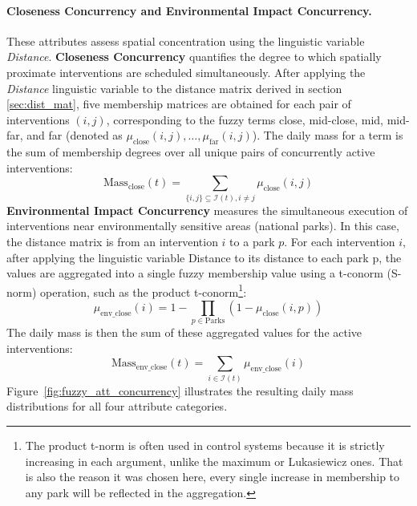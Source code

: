 \paragraph{Closeness Concurrency and Environmental Impact Concurrency.}
These attributes assess spatial concentration using the linguistic variable \textit{Distance}. \textbf{Closeness Concurrency} quantifies the degree to which spatially proximate interventions are scheduled simultaneously. After applying the \textit{Distance} linguistic variable to the distance matrix derived in section \ref{sec:dist_mat}, five membership matrices are obtained for each pair of interventions $(i, j)$, corresponding to the fuzzy terms close, mid-close, mid, mid-far, and far (denoted as $\mu_{\text{close}}(i, j),\dots ,\mu_{\text{far}}(i, j)$). The daily mass for a term is the sum of membership degrees over all unique pairs of concurrently active interventions:
\[
    \text{Mass}_{\text{close}}(t) = \sum_{\{i,j\} \subseteq \mathcal{I}(t), i \neq j} \mu_{\text{close}}(i, j)
\]
\textbf{Environmental Impact Concurrency} measures the simultaneous execution of interventions near environmentally sensitive areas (national parks). In this case, the distance matrix is from an intervention $i$ to a park $p$. 
For each intervention $i$, after applying the linguistic variable Distance to its distance to each park p, the values are aggregated into a single fuzzy membership value using a t-conorm (S-norm) operation, 
such as the product t-conorm\footnote{The product t-norm is often used in control systems because it is strictly increasing in each argument, unlike the maximum or Lukasiewicz ones. That is also the reason it was chosen here, every single increase in membership to any park will be reflected in the aggregation.}:
\[\mu_{\text{env\_close}}(i) =  1 - \prod_{p \in \text{Parks}} (1-\mu_{\text{close}}(i, p))\]
The daily mass is then the sum of these aggregated values for the active interventions: \[\text{Mass}_{\text{env\_close}}(t) = \sum_{i \in \mathcal{I}(t)} \mu_{\text{env\_close}}(i)\] Figure~\ref{fig:fuzzy_att_concurrency} illustrates the resulting daily mass distributions for all four attribute categories.

